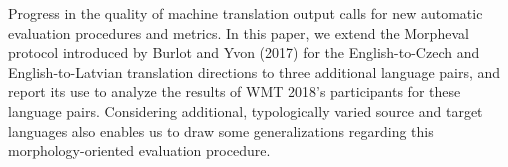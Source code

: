 Progress in the quality of machine translation output calls for new automatic evaluation procedures and metrics. In this paper, we extend the Morpheval protocol introduced by Burlot and Yvon (2017) for the English-to-Czech and English-to-Latvian translation directions to three additional language pairs, and report its use to analyze the results of WMT 2018's participants for these language pairs. Considering additional, typologically varied source and target languages also enables us to draw some generalizations regarding this morphology-oriented evaluation procedure.
